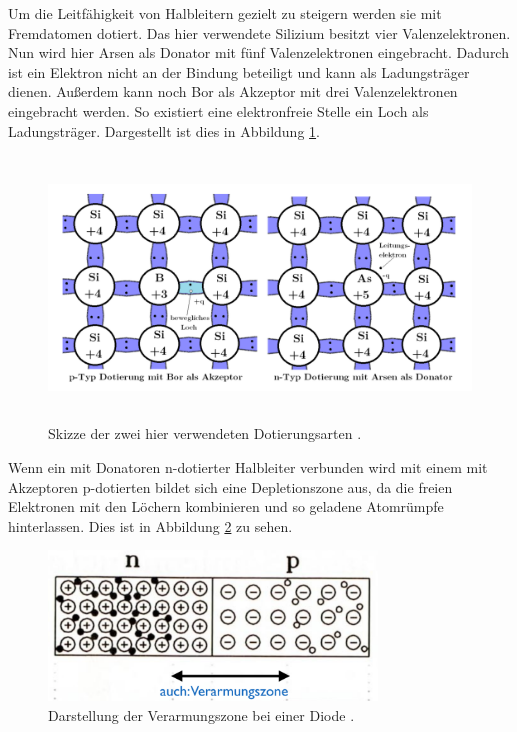 Um die Leitfähigkeit von Halbleitern gezielt zu steigern werden sie mit Fremdatomen dotiert. Das hier verwendete Silizium besitzt vier Valenzelektronen. Nun wird hier Arsen als Donator mit fünf Valenzelektronen eingebracht. Dadurch ist ein Elektron nicht an der Bindung beteiligt und kann als Ladungsträger dienen. Außerdem kann noch Bor als Akzeptor mit drei Valenzelektronen eingebracht werden. So existiert eine elektronfreie Stelle ein Loch als Ladungsträger. Dargestellt ist dies in Abbildung \ref{fig:dotierung}.

\begin{figure}
  \centering
  \includegraphics[height=7cm]{TimosAufrisse/dotierung.png}
  \caption{Skizze der zwei hier verwendeten Dotierungsarten \cite{anleitung}.}
  \label{fig:dotierung}
\end{figure}

Wenn ein mit Donatoren n-dotierter Halbleiter verbunden wird mit einem mit Akzeptoren p-dotierten bildet sich eine Depletionszone aus, da die freien Elektronen mit den Löchern kombinieren und so geladene Atomrümpfe hinterlassen. Dies ist in Abbildung \ref{fig:pnuebergang} zu sehen.

\begin{figure}
  \centering
  \includegraphics[height=4cm]{TimosAufrisse/pnuebergang.png}
  \caption{Darstellung der Verarmungszone bei einer Diode \cite{goessling}.}
  \label{fig:pnuebergang}
\end{figure}

